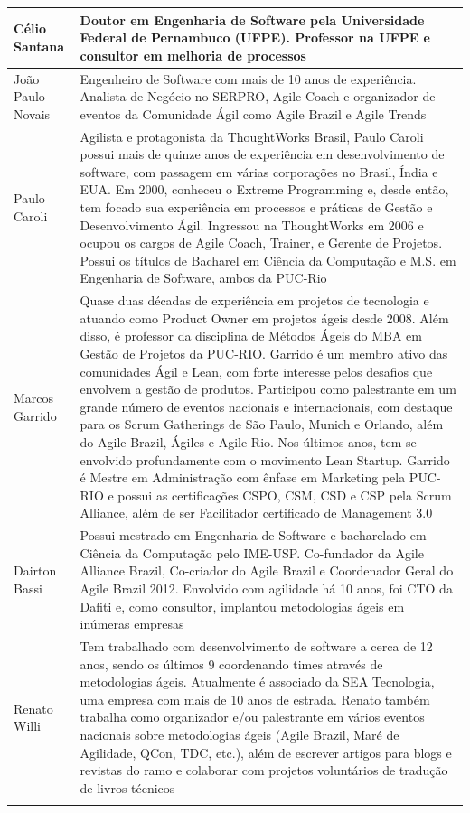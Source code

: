 \begin{tabularx}{\linewidth}{ | p{4cm} | X | }
	Célio Santana & Doutor em Engenharia de Software pela Universidade Federal de Pernambuco (UFPE). Professor na UFPE e consultor em melhoria de processos \\ \hline
	João Paulo Novais & Engenheiro de Software com mais de 10 anos de experiência. Analista de Negócio no SERPRO, Agile Coach e organizador de eventos da Comunidade Ágil como Agile Brazil e Agile Trends \\ \hline
	Paulo Caroli & Agilista e protagonista da ThoughtWorks Brasil, Paulo Caroli possui mais de quinze anos de experiência em desenvolvimento de software, com passagem em várias corporações no Brasil, Índia e EUA. Em 2000, conheceu o Extreme Programming e, desde então, tem focado sua experiência em processos e práticas de Gestão e Desenvolvimento Ágil. Ingressou na ThoughtWorks em 2006 e ocupou os cargos de Agile Coach, Trainer, e Gerente de Projetos. Possui os títulos de Bacharel em Ciência da Computação e M.S. em Engenharia de Software, ambos da PUC-Rio \\ \hline
	Marcos Garrido & Quase duas décadas de experiência em projetos de tecnologia e atuando como Product Owner em projetos ágeis desde 2008. Além disso, é professor da disciplina de Métodos Ágeis do MBA em Gestão de Projetos da PUC-RIO. Garrido é um membro ativo das comunidades Ágil e Lean, com forte interesse pelos desafios que envolvem a gestão de produtos. Participou como palestrante em um grande número de eventos nacionais e internacionais, com destaque para os Scrum Gatherings de São Paulo, Munich e Orlando, além do Agile Brazil, Ágiles e Agile Rio. Nos últimos anos, tem se envolvido profundamente com o movimento Lean Startup. Garrido é Mestre em Administração com ênfase em Marketing pela PUC-RIO e possui as certificações CSPO, CSM, CSD e CSP pela Scrum Alliance, além de ser Facilitador certificado de Management 3.0 \\ \hline
	Dairton Bassi & Possui mestrado em Engenharia de Software e bacharelado em Ciência da Computação pelo IME-USP. Co-fundador da Agile Alliance Brazil, Co-criador do Agile Brazil e Coordenador Geral do Agile Brazil 2012. Envolvido com agilidade há 10 anos, foi CTO da Dafiti e, como consultor, implantou metodologias ágeis em inúmeras empresas \\ \hline
	Renato Willi & Tem trabalhado com desenvolvimento de software a cerca de 12 anos, sendo os últimos 9 coordenando times através de metodologias ágeis. Atualmente é associado da SEA Tecnologia, uma empresa com mais de 10 anos de estrada. Renato também trabalha como organizador e/ou palestrante em vários eventos nacionais sobre metodologias ágeis (Agile Brazil, Maré de Agilidade, QCon, TDC, etc.), além de escrever artigos para blogs e revistas do ramo e colaborar com projetos voluntários de tradução de livros técnicos\\ \hline
	\captionsetup{justification=centering}
	\caption{Resumo sobre alguns profissionais da área de TI que responderam o formulário e se identificaram}
	\label{tab:mini-cvs}
\end{tabularx}

